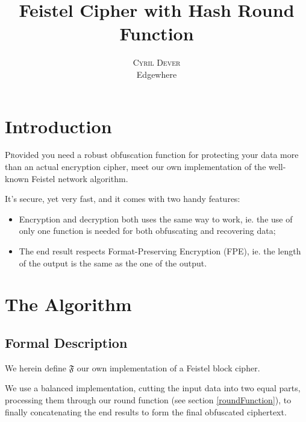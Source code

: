 \documentclass[twoside,twocolumn]{article}
\title{Feistel Cipher with Hash Round Function} %
\author{%
    \textsc{Cyril Dever}\\ %
    \normalsize Edgewhere \\ %
}
\date{\DTMusedate{thedate}}
\theoremstyle{definition}
\theoremstyle{remark}
\begin{document}
\maketitle


\section{Introduction}

\lettrine[nindent=0em,lines=3]{P}rovided you need a robust obfuscation function for protecting your data more than an actual encryption cipher, meet 
our own implementation of the well-known Feistel network algorithm.

It's secure, yet very fast, and it comes with two handy features:
\begin{itemize}
    \item Encryption and decryption both uses the same way to work, ie. the use of only one function is needed for both obfuscating and recovering data;
    \item The end result respects Format-Preserving Encryption (FPE), ie. the length of the output is the same as the one of the output. %
\end{itemize}

\section{The Algorithm}

\subsection{Formal Description}

We herein define $\mathfrak{F}$ our own implementation of a Feistel block cipher\cite{feistel:hf}. 

We use a balanced implementation, cutting the input data into two equal parts, processing them through our round function (see section 
\ref{roundFunction}), to finally concatenating the end results to form the final obfuscated ciphertext.
\end{document}
